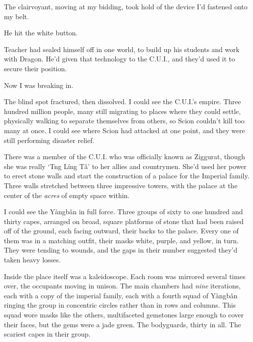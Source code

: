 The clairvoyant, moving at my bidding, took hold of the device I'd fastened onto my belt.



He hit the white button.



Teacher had sealed himself off in one world, to build up his students and work with Dragon.  He'd given that technology to the C.U.I., and they'd used it to secure their position.



Now I was breaking in.



The blind spot fractured, then dissolved.  I could see the C.U.I.'s empire.  Three hundred million people, many still migrating to places where they could settle, physically walking to separate themselves from others, so Scion couldn't kill too many at once.  I could see where Scion had attacked at one point, and they were still performing disaster relief.



There was a member of the C.U.I. who was officially known as Ziggurat, though she was really `Tng L\'{i}ng T\v{a}' to her allies and countrymen.  She'd used her power to erect stone walls and start the construction of a palace for the Imperial family.  Three walls stretched between three impressive towers, with the palace at the center of the \emph{acres} of empty space within.



I could see the Y\`{a}ngb\v{a}n in full force.  Three groups of sixty to one hundred and thirty capes, arranged on broad, square platforms of stone that had been raised off of the ground, each facing outward, their backs to the palace. Every one of them was in a matching outfit, their masks white, purple, and yellow, in turn.  They were tending to wounds, and the gaps in their number suggested they'd taken heavy losses.



Inside the place itself was a kaleidoscope.  Each room was mirrored several times over, the occupants moving in unison.  The main chambers had \emph{nine} iterations, each with a copy of the imperial family, each with a fourth squad of Y\`{a}ngb\v{a}n ringing the group in concentric circles rather than in rows and columns.  This squad wore masks like the others, multifaceted gemstones large enough to cover their faces, but the gems were a jade green.  The bodyguards, thirty in all.  The scariest capes in their group.



